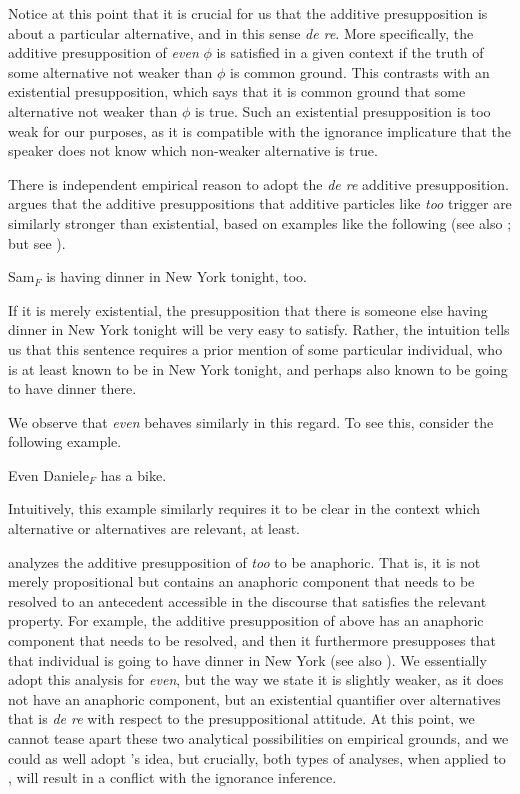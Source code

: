 \documentclass[output=paper]{langscibook}
\begin{document}
Notice at this point that it is crucial for us that the additive presupposition is about a particular alternative, and in this sense \textit{de re}. More specifically, the additive presupposition of \textit{even} $\phi$ is satisfied in a given context if the truth of some alternative not weaker than $\phi$ is common ground. This contrasts with an existential presupposition, which says that it is common ground that some alternative not weaker than $\phi$ is true. Such an existential presupposition is too weak for our purposes, as it is compatible with the ignorance implicature that the speaker does not know which non-weaker alternative is true.
  
There is independent empirical reason to adopt the \textit{de re} additive presupposition. \citet{kripke} argues that the additive presuppositions that additive particles like \textit{too} trigger are similarly stronger than existential, based on examples like the following (see also \citealt{geurtsvandersandt}; but see \citealt{ruys}).

    \ea Sam$_F$ is having dinner in New York tonight, too.\label{don-sud:ny}
    \z

\noindent If it is merely existential, the presupposition that there is someone else having dinner in New York tonight will be very easy to satisfy. Rather, the intuition tells us that this sentence requires a prior mention of some particular individual, who is at least known to be in New York tonight, and perhaps also known to be going to have dinner there.

We observe that \textit{even} behaves similarly in this regard. To see this, consider the following example.

     \ea Even Daniele$_F$ has a bike.\z

\noindent Intuitively, this example similarly requires it to be clear in the context which alternative or alternatives are relevant, at least.

\citet{kripke} analyzes the additive presupposition of \textit{too} to be anaphoric. That is, it is not merely propositional but contains an anaphoric component that needs to be resolved to an antecedent accessible in the discourse that satisfies the relevant property. For example, the additive presupposition of  above has an anaphoric component that needs to be resolved, and then it furthermore presupposes that that individual is going to have dinner in New York (see also \citealt{geurtsvandersandt}). We essentially adopt this analysis for \textit{even}, but the way we state it is slightly weaker, as it does not have an anaphoric component, but an existential quantifier over alternatives that is \textit{de re} with respect to the presuppositional attitude. At this point, we cannot tease apart these two analytical possibilities on empirical grounds, and we could as well adopt \citeauthor{kripke}'s idea, but crucially, both types of analyses, when applied to , will result in a conflict with the ignorance inference.
\end{document}
